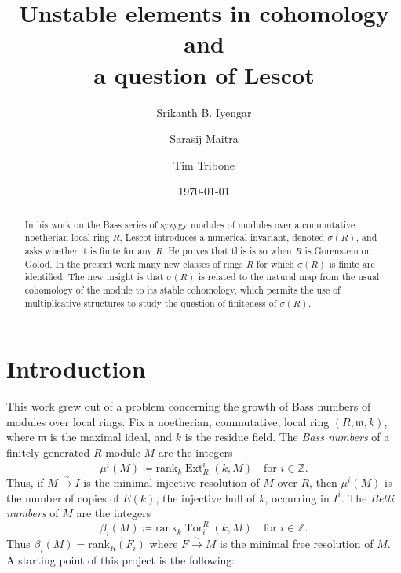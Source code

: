 \documentclass{amsart}
\title[Unstable elements in cohomology]{Unstable elements in cohomology and \\ a question  of Lescot}
\author[Iyengar]{Srikanth B. Iyengar}
\author[Maitra]{Sarasij Maitra}
\author[Tribone]{Tim Tribone}
\numberwithin{equation}{section}
\theoremstyle{plain}
\theoremstyle{definition}
\theoremstyle{remark}
\newcommand{\bbZ}{\mathbb{Z}}
\newcommand{\ext}{\operatorname{Ext}}
\newcommand{\rank}{\mathrm{rank}}
\newcommand{\tor}{\operatorname{Tor}}
\newcommand{\fm}{\mathfrak{m}}
\begin{document}
\begin{abstract}
In his work  on the Bass series of syzygy modules of modules over a commutative noetherian local ring $R$, Lescot introduces a numerical invariant, denoted $\sigma(R)$, and asks whether it is finite for any $R$. He proves that this is so when $R$ is Gorenstein or Golod. In the present work many new classes of rings $R$ for which $\sigma(R)$ is finite are identified. The new insight is that $\sigma(R)$ is related to the natural map from the usual cohomology of the module to its stable cohomology, which permits the use of multiplicative structures to study the question of finiteness of $\sigma(R)$.
	\end{abstract}

\date{\today}

\maketitle

\setcounter{tocdepth}{1}
\tableofcontents


\section{Introduction}
This work grew out of a problem concerning the growth of Bass numbers of modules over local rings.  Fix a noetherian, commutative, local ring $(R,\fm,k)$, where $\fm$ is the maximal ideal, and $k$ is the residue field. The \emph{Bass numbers} of a finitely generated $R$-module $M$ are the integers
\[
\mu^i(M)\coloneqq \rank_k\ext^i_R(k,M) \quad \text{for $i\in \bbZ$.}
\]
Thus, if $M\xrightarrow{\sim} I$ is the minimal injective resolution of $M$ over $R$, then $\mu^i(M)$ is the number of copies of $E(k)$, the injective hull of $k$, occurring in $I^i$.  The \emph{Betti numbers} of $M$ are the integers
\[
\beta_i(M)\coloneqq \rank_k\tor^R_i(k,M) \quad \text{for $i\in \bbZ$.}
\]
Thus $\beta_i(M)=\rank_R(F_i)$ where $F\xrightarrow{\sim}M$ is the minimal free resolution of $M$. A starting point of this project is the following:
\end{document}

